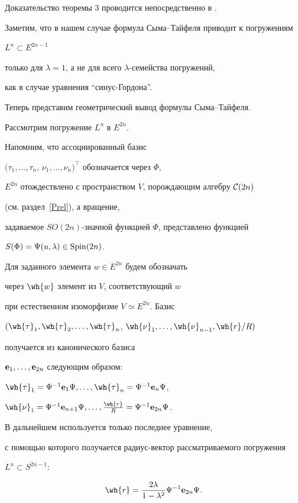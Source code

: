 Доказательство теоремы 3 проводится непосредственно в \cite{Ci-space}.


Заметим, что в нашем случае формула Сыма--Тайфеля приводит к погружениям


$L^n \subset E^{2n-1}$ 


только для $\lambda=1$, а не для всего $\lambda$-семейства погружений,


как в случае уравнения ``синус-Гордона''. 





Теперь представим геометрический вывод формулы Сыма--Тайфеля.


Рассмотрим погружение $L^n$ в $E^{2n}$.


Напомним, что ассоциированный базис


$(\tau_1,\dotsc,\tau_n$, $\nu_1,\dotsc,\nu_n)^\top$ обозначается через $\Phi$,


$E^{2n}$ отождествлено с пространством $V$, порождающим алгебру ${\cal C}(2n)$


(см. раздел~\ref{Prel}), а вращение,


задаваемое $SO(2n)$-значной функцией $\Phi$, представлено функцией


$S(\Phi) = \Psi(u,\lambda)\in \operatorname{Spin}(2n)$.


Для заданного элемента $w \in E^{2n}$ будем обозначать


через $\wh{w}$ элемент из $V$, соответствующий $w$


при естественном изоморфизме $V \simeq E^{2n}$. Базис


$(\wh{\tau}_1, \wh{\tau}_2, \dotsc, \wh{\tau}_n$, $\wh{\nu}_1, \dotsc, 


\wh{\nu}_{n-1}, \wh{r}/R)$ 


получается из канонического базиса


$\bold e_1,\dotsc,\bold e_{2n}$ следующим образом:


$\wh{\tau}_1 = \Psi^{-1} \e_1 \Psi, \dotsc,


\wh{\tau}_n = \Psi^{-1} \e_n \Psi$,


$\wh{\nu}_1 = \Psi^{-1} \e_{n+1} \Psi, \dotsc, 


\frac{\wh{r}}{R} = \Psi^{-1} \e_{2n} \Psi$.


В дальнейшем используется только последнее уравнение,


с помощью которого получается радиус-вектор рассматриваемого погружения


$L^n \subset S^{2n-1}$:


\begin{equation}


\label{bfr}


\wh{r} = \frac{2\lambda}{1-\lambda^2} \Psi^{-1} \e_{2n} \Psi.


\end{equation}



